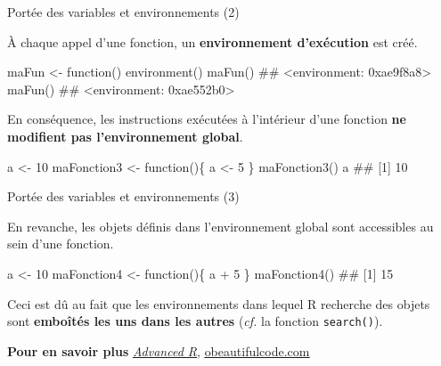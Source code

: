 \documentclass[12pt,handout,ignorenonframetext,]{beamer}
\newenvironment{Shaded}{}{}
\newcommand{\KeywordTok}[1]{\textcolor[rgb]{0.00,0.00,1.00}{#1}}
\newcommand{\DecValTok}[1]{#1}
\newcommand{\StringTok}[1]{\textcolor[rgb]{0.00,0.50,0.50}{#1}}
\newcommand{\ControlFlowTok}[1]{\textcolor[rgb]{0.00,0.00,1.00}{#1}}
\newcommand{\OperatorTok}[1]{#1}
\newcommand{\NormalTok}[1]{#1}
\renewenvironment{Shaded}{\begin{snugshade}}{\end{snugshade}}
\begin{document}
\begin{frame}[fragile]{\large Portée des variables et environnements
(2)}

\small
À chaque appel d'une fonction, un \textbf{environnement d'exécution} est
créé.

\footnotesize

\begin{Shaded}
\begin{Highlighting}[]
\NormalTok{maFun <-}\StringTok{ }\ControlFlowTok{function}\NormalTok{() }\KeywordTok{environment}\NormalTok{()}
\KeywordTok{maFun}\NormalTok{()}
\NormalTok{  ## <environment: 0xae9f8a8>}
\KeywordTok{maFun}\NormalTok{()}
\NormalTok{  ## <environment: 0xae552b0>}
\end{Highlighting}
\end{Shaded}

\pause \small
En conséquence, les instructions exécutées à l'intérieur d'une fonction
\textbf{ne modifient pas l'environnement global}.

\footnotesize

\begin{Shaded}
\begin{Highlighting}[]
\NormalTok{a <-}\StringTok{ }\DecValTok{10}
\NormalTok{maFonction3 <-}\StringTok{ }\ControlFlowTok{function}\NormalTok{()\{}
\NormalTok{  a <-}\StringTok{ }\DecValTok{5}
\NormalTok{\}}
\KeywordTok{maFonction3}\NormalTok{()}
\NormalTok{a}
\NormalTok{  ## [1] 10}
\end{Highlighting}
\end{Shaded}

\end{frame}

\begin{frame}[fragile]{\large Portée des variables et environnements
(3)}

En revanche, les objets définis dans l'environnement global sont
accessibles au sein d'une fonction.

\footnotesize

\begin{Shaded}
\begin{Highlighting}[]
\NormalTok{a <-}\StringTok{ }\DecValTok{10}
\NormalTok{maFonction4 <-}\StringTok{ }\ControlFlowTok{function}\NormalTok{()\{}
\NormalTok{  a }\OperatorTok{+}\StringTok{ }\DecValTok{5}
\NormalTok{\}}
\KeywordTok{maFonction4}\NormalTok{()}
\NormalTok{  ## [1] 15}
\end{Highlighting}
\end{Shaded}

\pause \normalsize
Ceci est dû au fait que les environnements dans lequel R recherche des
objets sont \textbf{emboîtés les uns dans les autres} (\textit{cf.} la
fonction \texttt{search()}).

\textbf{Pour en savoir plus}
\href{http://adv-r.had.co.nz/Environments.html\#function-envs}{\underline{\textit{Advanced R}}},
\href{http://blog.obeautifulcode.com/R/How-R-Searches-And-Finds-Stuff/}{\underline{obeautifulcode.com}}

\end{frame}
\end{document}
